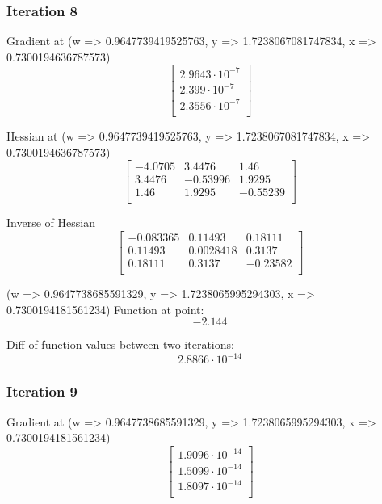 \documentclass{article}
\begin{document}
\subsubsection{Iteration 8}
Gradient at (w => 0.9647739419525763, y => 1.7238067081747834, x => 0.7300194636787573)
\begin{equation}
\left[
\begin{array}{c}
2.9643 \cdot 10^{-7} \\
2.399 \cdot 10^{-7} \\
2.3556 \cdot 10^{-7} \\
\end{array}
\right]
\end{equation}

Hessian at (w => 0.9647739419525763, y => 1.7238067081747834, x => 0.7300194636787573)
\begin{equation}
\left[
\begin{array}{ccc}
-4.0705 & 3.4476 & 1.46 \\
3.4476 & -0.53996 & 1.9295 \\
1.46 & 1.9295 & -0.55239 \\
\end{array}
\right]
\end{equation}

Inverse of Hessian
\begin{equation}
\left[
\begin{array}{ccc}
-0.083365 & 0.11493 & 0.18111 \\
0.11493 & 0.0028418 & 0.3137 \\
0.18111 & 0.3137 & -0.23582 \\
\end{array}
\right]
\end{equation}

(w => 0.9647738685591329, y => 1.7238065995294303, x => 0.7300194181561234)
Function at point:
\begin{equation}
-2.144
\end{equation}

Diff of function values between two iterations:
\begin{equation}
2.8866 \cdot 10^{-14}
\end{equation}

\subsubsection{Iteration 9}
Gradient at (w => 0.9647738685591329, y => 1.7238065995294303, x => 0.7300194181561234)
\begin{equation}
\left[
\begin{array}{c}
1.9096 \cdot 10^{-14} \\
1.5099 \cdot 10^{-14} \\
1.8097 \cdot 10^{-14} \\
\end{array}
\right]
\end{equation}
\end{document}
